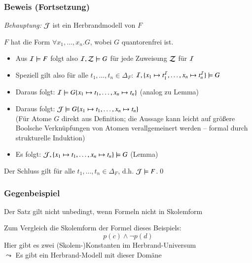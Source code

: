 \documentclass[aspectratio=1610,onlymath]{beamer}
\begin{document}
\begin{frame}\frametitle{Beweis (Fortsetzung)}

\emph{Behauptung:} \alert{$\mathcal{J}$ ist ein Herbrandmodell von $F$}\bigskip

$F$ hat die Form $\forall x_1,\ldots, x_n.G$, wobei $G$ quantorenfrei ist.\pause
\begin{itemize}
\item Aus $\mathcal{I}\models F$ folgt also $\mathcal{I},\mathcal{Z}\models G$ für jede Zuweisung $\mathcal{Z}$ für $\mathcal{I}$\pause
\item Speziell gilt also für alle $t_1,\ldots,t_n\in\Delta_F$: $\mathcal{I},\{x_1\mapsto t_1^{\mathcal{I}},\ldots,x_n\mapsto t_n^{\mathcal{I}}\}\models G$\pause
\item Daraus folgt: $\mathcal{I}\models G\{x_1\mapsto t_1,\ldots,x_n\mapsto t_n\}$  (analog zu Lemma)\pause
\item Daraus folgt: $\mathcal{J}\models G\{x_1\mapsto t_1,\ldots,x_n\mapsto t_n\}$\\
{\footnotesize(Für Atome $G$ direkt aus Definition; die Aussage kann leicht auf größere Boolsche Verknüpfungen von Atomen verallgemeinert werden -- formal durch strukturelle Induktion)}\pause
\item Es folgt: $\mathcal{J},\{x_1\mapsto t_1,\ldots,x_n\mapsto t_n\}\models G$ (Lemma)
\end{itemize}
Der Schluss gilt für alle $t_1,\ldots,t_n\in\Delta_F$, d.h. $\mathcal{J}\models F$.\qed

\end{frame}

\begin{frame}\frametitle{Gegenbeispiel}

Der Satz gilt nicht unbedingt, wenn Formeln nicht in Skolemform \bigskip


Zum Vergleich die Skolemform der Formel dieses Beispiels:
\[ p(c)\wedge\neg p(d)\]
Hier gibt es zwei (Skolem-)Konstanten im Herbrand-Universum\\
$\leadsto$ Es gibt ein Herbrand-Modell mit dieser Domäne

\end{frame}
\end{document}
